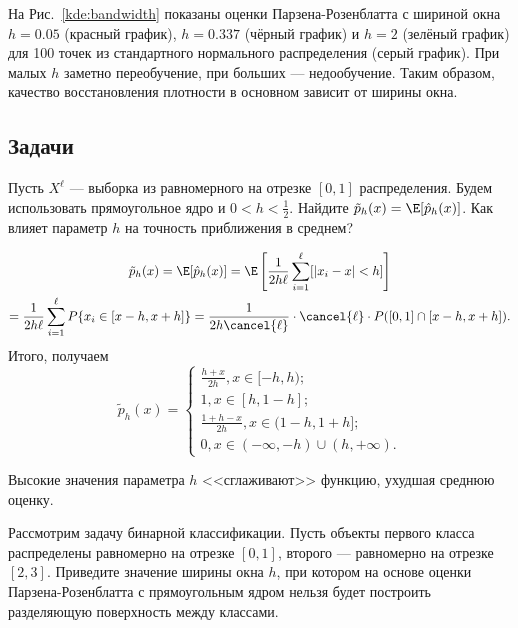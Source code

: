 {На Рис.~\ref{kde:bandwidth} показаны оценки Парзена-Розенблатта с шириной окна
$h=0.05$ (красный график), $h=0.337$ (чёрный график) и $h=2$ (зелёный график)
для 100 точек из стандартного нормального распределения (серый график). При
малых $h$ заметно переобучение, при больших --- недообучение. Таким образом,
качество восстановления плотности в основном зависит от ширины окна.

\newpage
\subsection*{Задачи}

\begin{problem}
Пусть $X^\ell$ --- выборка из равномерного на отрезке $[0,1]$ распределения.
Будем использовать прямоугольное ядро и $0 < h < \frac{1}{2}$. Найдите
$\tilde{p}_h(x) = \E[\hat{p}_h(x)]$. Как влияет параметр $h$ на точность
приближения в среднем?
\end{problem}

\begin{solution}
\begin{multline*}
\tilde{p}_h(x) = \E[\hat{p}_h(x)]
  = \E\left[\frac{1}{2h\ell}\sum_{i = 1}^\ell [|x_i - x| < h]\right]\\
  = \frac{1}{2h\ell}\sum_{i = 1}^\ell P\{x_i \in [x - h, x + h]\}
  = \frac{1}{2h \cancel{\ell}} \cdot \cancel{\ell} \cdot P([0, 1] \cap [x - h, x + h]).
\end{multline*}
Итого, получаем
\begin{equation*}
\tilde{p}_h(x) =
\begin{cases}
\frac{h + x}{2h}, x \in [-h, h);\\
1, x \in [h, 1 - h];\\
\frac{1 + h - x}{2h}, x \in (1 - h, 1 + h];\\
0, x \in (-\infty, -h) \cup (h, +\infty).
\end{cases}
\end{equation*}

Высокие значения параметра $h$ <<сглаживают>> функцию, ухудшая среднюю оценку.
\end{solution}

\begin{problem}
Рассмотрим задачу бинарной классификации. Пусть объекты первого класса
распределены равномерно на отрезке $[0, 1]$, второго --- равномерно на отрезке
$[2, 3]$. Приведите значение ширины окна $h$, при котором на основе оценки
Парзена-Розенблатта с прямоугольным ядром нельзя будет построить разделяющую
поверхность между классами.
\end{problem}

}
